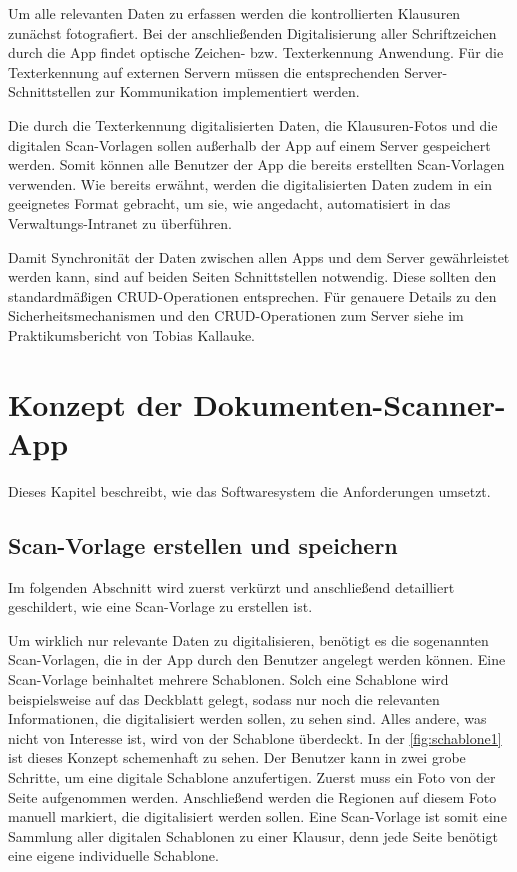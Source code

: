 \documentclass[notables, nomenclature, oneside, 150]{HSMW-Thesis}
\begin{document}
	Um alle relevanten Daten zu erfassen werden die kontrollierten Klausuren zunächst fotografiert. Bei der anschließenden Digitalisierung aller Schriftzeichen durch die App findet optische Zeichen- bzw. Texterkennung Anwendung. Für die Texterkennung auf externen Servern müssen die entsprechenden Server-Schnittstellen zur Kommunikation implementiert werden. 
	 
	Die durch die Texterkennung digitalisierten Daten, die Klausuren-Fotos und die digitalen Scan-Vorlagen sollen außerhalb der App auf einem Server gespeichert werden. Somit können alle Benutzer der App die bereits erstellten Scan-Vorlagen verwenden. Wie bereits erwähnt, werden die digitalisierten Daten zudem in ein geeignetes Format gebracht, um sie, wie angedacht, automatisiert in das Verwaltungs-Intranet zu überführen.
	
	Damit Synchronität der Daten zwischen allen Apps und dem Server gewährleistet werden kann, sind auf beiden Seiten Schnittstellen notwendig. Diese sollten den standardmäßigen CRUD-Operationen entsprechen. Für genauere Details zu den Sicherheitsmechanismen und den CRUD-Operationen zum Server siehe im Praktikumsbericht von Tobias Kallauke. 


\chapter{Konzept der Dokumenten-Scanner-App}\label{ch:konzept}
	Dieses Kapitel beschreibt, wie das Softwaresystem die Anforderungen umsetzt.
	
	\section{Scan-Vorlage erstellen und speichern}
	
		Im folgenden Abschnitt wird zuerst verkürzt und anschließend detailliert geschildert, wie eine Scan-Vorlage zu erstellen ist.
    
		Um wirklich nur relevante Daten zu digitalisieren, benötigt es die sogenannten Scan-Vorlagen, die in der App durch den Benutzer angelegt werden können. Eine Scan-Vorlage beinhaltet mehrere Schablonen. Solch eine Schablone wird beispielsweise auf das Deckblatt gelegt, sodass nur noch die relevanten Informationen, die digitalisiert werden sollen, zu sehen sind. Alles andere, was nicht von Interesse ist, wird von der Schablone überdeckt. In der \autoref{fig:schablone1} ist dieses Konzept schemenhaft zu sehen. Der Benutzer kann in zwei grobe Schritte, um eine digitale Schablone anzufertigen. Zuerst muss ein Foto von der Seite aufgenommen werden. Anschließend werden die Regionen auf diesem Foto manuell markiert, die digitalisiert werden sollen. Eine Scan-Vorlage ist somit eine Sammlung aller digitalen Schablonen zu einer Klausur, denn jede Seite benötigt eine eigene individuelle Schablone.
				
\end{document}
